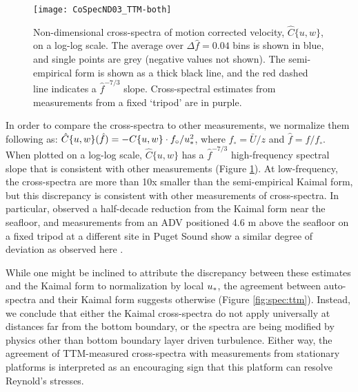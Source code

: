 \begin{figure}[t]
  \centering
  \texttt{[image: CoSpecND03\_TTM-both]}
  \caption{Non-dimensional cross-spectra of motion corrected velocity, $\hat{C}\{u,w\}$, on a log-log scale. The average over $\Delta \hat{f} = 0.04$ bins is shown in blue, and single points are grey (negative values not shown). The semi-empirical \cite{Kaimal++1972} form is shown as a thick black line, and the red dashed line indicates a $\hat{f}^{-7/3}$ slope. Cross-spectral estimates from measurements from a fixed `tripod' are in purple.}
  \label{fig:cspecnd:ttm}
\end{figure}

In order to compare the cross-spectra to other measurements, we normalize them following \cite{Kaimal++1972} as: $\hat{C}\{u,w\}(\hat{f}) = -C\{u,w\} \cdot f_\circ / u_*^2$, where $f_\circ = \bar{U} / z$ and $\hat{f} = f / f_\circ$. 
When plotted on a log-log scale, $\hat{C}\lbrace u,w \rbrace$ has a $\hat{f}^{-7/3}$ high-frequency spectral slope that is consistent with other measurements (Figure \ref{fig:cspecnd:ttm}). At low-frequency, the cross-spectra are more than 10x smaller than the semi-empirical Kaimal form, but this discrepancy is consistent with other measurements of cross-spectra. In particular, \cite{Walter++2011} observed a half-decade reduction from the Kaimal form near the seafloor, and measurements from an ADV positioned 4.6 m above the seafloor on a fixed tripod at a different site in Puget Sound show a similar degree of deviation as observed here \cite[]{Thomson++2012}. %

While one might be inclined to attribute the discrepancy between these estimates and the Kaimal form to normalization by local $u_*$, the agreement between auto-spectra and their Kaimal form suggests otherwise (Figure \ref{fig:spec:ttm}). Instead, we conclude that either the Kaimal cross-spectra do not apply universally at distances far from the bottom boundary, or the spectra are being modified by physics other than bottom boundary layer driven turbulence. Either way, the agreement of TTM-measured cross-spectra with measurements from stationary platforms is interpreted as an encouraging sign that this platform can resolve Reynold's stresses.

